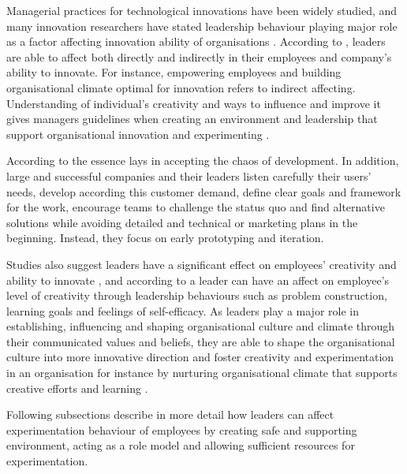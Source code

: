 Managerial practices for technological innovations have been widely studied, and many innovation researchers have stated leadership behaviour playing major role as a factor affecting innovation ability of organisations \citep{bujis2007innovation,jung2003role,jung2001transformational,amabile1998kill,mumford1988creativity}. According to \citet{jung2003role}, leaders are able to affect both directly and indirectly in their employees and company's ability to innovate. For instance, empowering employees and building organisational climate optimal for innovation refers to indirect affecting. Understanding of individual's creativity and ways to influence and improve it gives managers guidelines when creating an environment and leadership that support organisational innovation and experimenting \citep{redmond1993putting}. 

According to \citet{quinn1985managing} the essence lays in accepting the chaos of development. In addition, large and successful companies and their leaders listen carefully their users' needs, develop according this customer demand, define clear goals and framework for the work, encourage teams to challenge the status quo and find alternative solutions while avoiding detailed and technical or marketing plans in the beginning. Instead, they focus on early prototyping and iteration. \citep{quinn1985managing}

 Studies also suggest leaders have a significant effect on employees' creativity and ability to innovate \citep{mumford2002leading,jung2001transformational,amabile1998kill,hennessey19881}, and according to \citet{redmond1993putting} a leader can have an affect on employee's level of creativity through leadership behaviours such as problem construction, learning goals and feelings of self-efficacy. As leaders play a major role in establishing, influencing and shaping organisational culture and climate through their communicated values and beliefs, they are able to shape the organisational culture into more innovative direction and foster creativity and experimentation in an organisation \citep{jung2003role,schein2010organizational} for instance by nurturing organisational climate that supports creative efforts and learning \citep{yukl2002leadership}. 

Following subsections describe in more detail how leaders can affect experimentation behaviour of employees by creating safe and supporting environment, acting as a role model and allowing sufficient resources for experimentation. 

